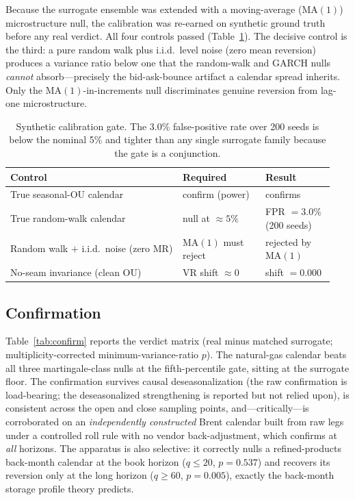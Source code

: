\documentclass[11pt,a4paper]{article}
\newcommand{\VR}{\mathrm{VR}}
\begin{document}
Because the surrogate ensemble was extended with a moving-average ($\mathrm{MA}(1)$) microstructure
null, the calibration was re-earned on synthetic ground truth before any real verdict. All four
controls passed (Table~\ref{tab:gate}). The decisive control is the third: a pure random walk plus
i.i.d.\ level noise (zero mean reversion) produces a variance ratio below one that the random-walk and
GARCH nulls \emph{cannot} absorb---precisely the bid-ask-bounce artifact a calendar spread inherits.
Only the $\mathrm{MA}(1)$-in-increments null discriminates genuine reversion from lag-one
microstructure.

\begin{table}[h]
\centering
\small
\begin{tabular}{@{}p{0.50\linewidth} p{0.24\linewidth} p{0.20\linewidth}@{}}
\toprule
\textbf{Control} & \textbf{Required} & \textbf{Result} \\
\midrule
True seasonal-OU calendar & confirm (power) & confirms \\
True random-walk calendar & null at $\approx 5\%$ & FPR $=3.0\%$ (200 seeds) \\
Random walk $+$ i.i.d.\ noise (zero MR) & $\mathrm{MA}(1)$ must reject & rejected by $\mathrm{MA}(1)$ \\
No-seam invariance (clean OU) & $\VR$ shift $\approx 0$ & shift $=0.000$ \\
\bottomrule
\end{tabular}
\caption{Synthetic calibration gate. The 3.0\% false-positive rate over 200 seeds is below the nominal
5\% and tighter than any single surrogate family because the gate is a conjunction.}
\label{tab:gate}
\end{table}

\subsection{Confirmation}

Table~\ref{tab:confirm} reports the verdict matrix (real minus matched surrogate; multiplicity-corrected
minimum-variance-ratio $p$). The natural-gas calendar beats all three martingale-class nulls at the
fifth-percentile gate, sitting at the surrogate floor. The confirmation survives causal
deseasonalization (the raw confirmation is load-bearing; the deseasonalized strengthening is reported
but not relied upon), is consistent across the open and close sampling points, and---critically---is
corroborated on an \emph{independently constructed} Brent calendar built from raw legs under a
controlled roll rule with no vendor back-adjustment, which confirms at \emph{all} horizons. The
apparatus is also selective: it correctly nulls a refined-products back-month calendar at the book
horizon ($q\leq 20$, $p=0.537$) and recovers its reversion only at the long horizon ($q\geq 60$,
$p=0.005$), exactly the back-month storage profile theory predicts.
\end{document}

